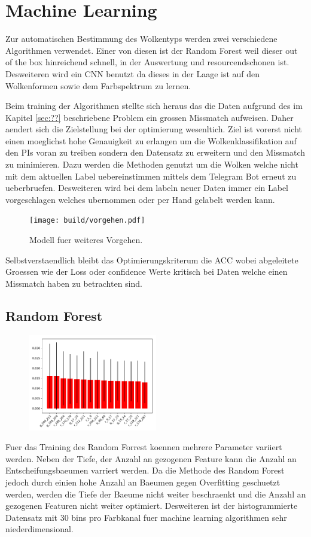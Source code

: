 \section{Machine Learning}

Zur automatischen Bestimmung des Wolkentyps werden zwei verschiedene Algorithmen
verwendet. 
Einer von diesen ist der Random Forest weil dieser out of the box hinreichend schnell,
in der Auswertung und resourcendschonen ist.
Desweiteren wird ein CNN benutzt da dieses in der Laage ist auf den Wolkenformen
sowie dem Farbspektrum zu lernen. 

Beim training der Algorithmen stellte sich heraus das die Daten aufgrund des im
Kapitel \ref{sec:??} beschriebene Problem ein grossen Missmatch aufweisen. 
Daher aendert sich die Zielstellung bei der optimierung wesenltich.
Ziel ist vorerst nicht einen moeglichst hohe Genauigkeit zu erlangen um die
Wolkenklassifikation auf den PIs voran zu treiben sondern den Datensatz zu
erweitern und den Missmatch zu minimieren.
Dazu werden die Methoden genutzt um die Wolken welche nicht mit dem aktuellen
Label uebereinstimmen mittels dem Telegram Bot erneut zu ueberbruefen.
Desweiteren wird bei dem labeln neuer Daten immer ein Label vorgeschlagen
welches ubernommen oder per Hand gelabelt werden kann.
\begin{figure}
		\centering
		\texttt{[image: build/vorgehen.pdf]}
		\caption{Modell fuer weiteres Vorgehen.}
		\label{fig:}
\end{figure}

Selbstverstaendlich bleibt das Optimierungskriterum die ACC wobei abgeleitete
Groessen wie der Loss oder confidence Werte kritisch bei Daten welche einen
Missmatch haben zu betrachten sind.

\subsection{Random Forest}%
\label{sub:random_forest}
\begin{figure}
		\centering
		\includegraphics[width=0.5\textwidth]{./pictures/train_rf.pdf}
		\caption{}
		\label{fig:}
\end{figure}
Fuer das Training des Random Forrest koennen mehrere Parameter variiert werden.
Neben der Tiefe, der Anzahl an gezogenen Feature kann die Anzahl an
Entscheifungsbaeumen varriert werden.
Da die Methode des Random Forest jedoch durch einien hohe Anzahl an Baeumen
gegen Overfitting geschuetzt werden, werden die Tiefe der Baeume nicht weiter
beschraenkt und die Anzahl an gezogenen Featuren nicht weiter optimiert.
Desweiteren ist der histogrammierte Datensatz mit 30 bins pro Farbkanal fuer
machine learning algorithmen sehr niederdimensional.

